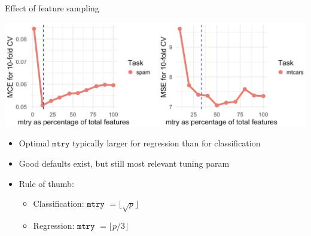 \documentclass[11pt,compress,t,notes=noshow, xcolor=table]{beamer}
\begin{document}
\begin{frame2}{Effect of feature sampling}

\begin{center}
\includegraphics[width=1\textwidth]{figure/forest-mtry.png}
\end{center}

\begin{itemize}

\item Optimal $\texttt{mtry}$ typically larger for regression than for classification
\item Good defaults exist, but still most relevant tuning param
\item Rule of thumb:
\begin{itemize}
\item Classification: $\texttt{mtry}$ $ = \lfloor \sqrt{p} \rfloor$
\item Regression: $\texttt{mtry}$ $ = \lfloor p/3 \rfloor$
\end{itemize}
\end{itemize}

\end{frame2}
\end{document}
